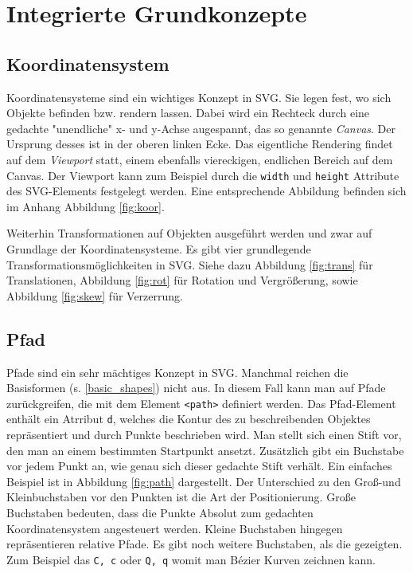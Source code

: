 \section{Integrierte Grundkonzepte}

\subsection{Koordinatensystem}
Koordinatensysteme sind ein wichtiges Konzept in SVG. Sie legen fest, wo sich Objekte befinden bzw. rendern lassen. Dabei wird ein Rechteck durch eine gedachte "unendliche" x- und y-Achse augespannt, das so genannte \emph{Canvas}. Der Ursprung desses ist in der oberen linken Ecke.
Das eigentliche Rendering findet auf dem \emph{Viewport} statt, einem ebenfalls viereckigen, endlichen Bereich auf dem Canvas. Der Viewport kann zum Beispiel durch die \texttt{width} und \texttt{height} Attribute des SVG-Elements festgelegt werden.
Eine entsprechende Abbildung befinden sich im Anhang Abbildung \ref{fig:koor}.

Weiterhin Transformationen auf Objekten ausgeführt werden und zwar auf Grundlage der Koordinatensysteme. Es gibt vier grundlegende Transformationsmöglichkeiten in SVG. Siehe dazu Abbildung \ref{fig:trans} für Translationen, Abbildung \ref{fig:rot} für Rotation und Vergrößerung, sowie Abbildung \ref{fig:skew} für Verzerrung.

\subsection{Pfad}
Pfade sind ein sehr mächtiges Konzept in SVG. Manchmal reichen die Basisformen (s. \ref{basic_shapes}) nicht aus. In diesem Fall kann man auf Pfade zurückgreifen, die mit dem Element \texttt{<path>} definiert werden.
Das Pfad-Element enthält ein Atrribut \texttt{d}, welches die Kontur des zu beschreibenden Objektes repräsentiert und durch Punkte beschrieben wird. Man stellt sich einen Stift vor, den man an einem bestimmten Startpunkt ansetzt. Zusätzlich gibt ein Buchstabe vor jedem Punkt an, wie genau sich dieser gedachte Stift verhält. Ein einfaches Beispiel ist in Abbildung \ref{fig:path} dargestellt.
Der Unterschied zu den Groß-und Kleinbuchstaben vor den Punkten ist die Art der Positionierung. Große Buchstaben bedeuten, dass die Punkte Absolut zum gedachten Koordinatensystem angesteuert werden. Kleine Buchstaben hingegen repräsentieren relative Pfade. Es gibt noch weitere Buchstaben, als die gezeigten. Zum Beispiel das \texttt{C, c} oder \texttt{Q, q} womit man Bézier Kurven zeichnen kann.

